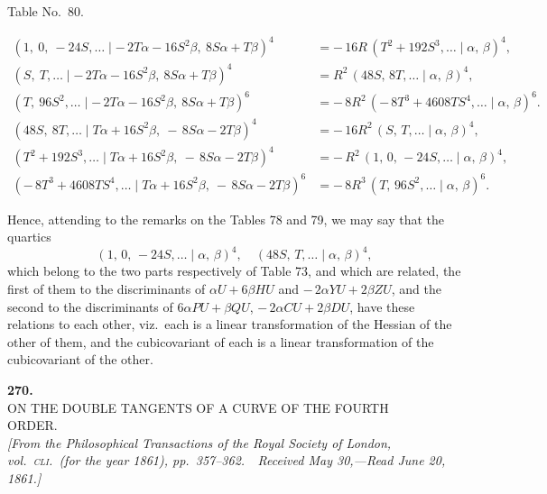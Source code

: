 \documentclass[11pt]{article}
\newcommand{\Cdel}{\mid}
\begin{document}
\begin{center}Table No.~80.\end{center}
\[
\begin{aligned}
   (1,\ 0,\ -24 S,\ldots\Cdel -\,2 T\alpha - 16 S^2\beta,\ 8 S\alpha + T\beta)^4 &= -\,16 R\,(T^2 + 192 S^3,\ldots\Cdel\alpha,\,\beta)^4,\\
   (S,\ T,\ldots\Cdel -\,2 T\alpha - 16 S^2\beta,\ 8 S\alpha + T\beta)^4 &= R^2\,(48 S,\,8 T,\ldots\Cdel\alpha,\,\beta)^4,\\
   (T,\ 96 S^2,\ldots\Cdel -\,2 T\alpha - 16 S^2\beta,\ 8 S\alpha + T\beta)^6 &= -\,8 R^2\,(-\,8 T^3 + 4608 T S^4,\ldots\Cdel\alpha,\,\beta)^6.\\[6pt]
   (48 S,\ 8 T,\ldots\Cdel T\alpha + 16 S^2\beta,\ -\,8 S\alpha - 2 T\beta)^4 &= -\,16 R^2\,(S,\,T,\ldots\Cdel\alpha,\,\beta)^4,\\
   (T^2 + 192 S^3,\ldots\Cdel T\alpha + 16 S^2\beta,\ -\,8 S\alpha - 2 T\beta)^4 &= -\,R^2\,(1,\,0,\,-24 S,\ldots\Cdel\alpha,\,\beta)^4,\\
   (-\,8 T^3 + 4608 T S^4,\ldots\Cdel T\alpha + 16 S^2\beta,\ -\,8 S\alpha - 2 T\beta)^6 &= -\,8 R^3\,(T,\,96 S^2,\ldots\Cdel\alpha,\,\beta)^6.
\end{aligned}
\]

\medskip

\noindent Hence, attending to the remarks on the Tables 78 and 79, we may say that the quartics
\[
   (1,\,0,\,-24 S,\ldots\Cdel\alpha,\,\beta)^4,\quad (48 S,\,T,\ldots\Cdel\alpha,\,\beta)^4,
\]
which belong to the two parts respectively of Table 73, and which are related, the first of them to the discriminants of $\alpha U + 6\beta H U$ and $-\,2\alpha Y U + 2\beta Z U$, and the second to the discriminants of $6\alpha P U + \beta Q U$, $-\,2\alpha C U + 2\beta D U$, have these relations to each other, viz.\ each is a linear transformation of the Hessian of the other of them, and the cubicovariant of each is a linear transformation of the cubicovariant of the other.

\newpage
\setcounter{page}{342}


\begin{center}
\textbf{270.}\\[1em]
{\Large ON THE DOUBLE TANGENTS OF A CURVE OF THE FOURTH}\\[0.3em]
{\Large ORDER.}\\[1em]
\textit{[From the Philosophical Transactions of the Royal Society of London, vol.~\textsc{cli}.\ (for the year 1861), pp.~357--362.\ \ Received May 30,---Read June 20, 1861.]}
\end{center}
\end{document}
